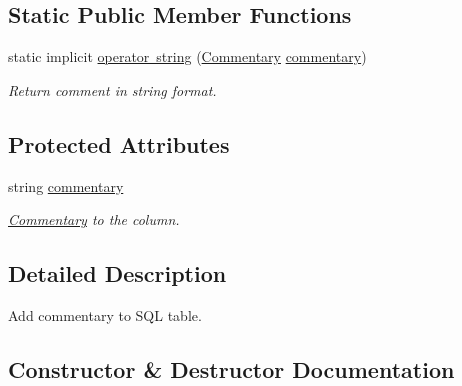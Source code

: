 \subsection*{Static Public Member Functions}
\begin{DoxyCompactItemize}
\item 
static implicit \mbox{\hyperlink{class_uniform_data_operator_1_1_sql_1_1_attributes_1_1_commentary_adb8a38bd8b9febe1222e715e7f7309d8}{operator string}} (\mbox{\hyperlink{class_uniform_data_operator_1_1_sql_1_1_attributes_1_1_commentary}{Commentary}} \mbox{\hyperlink{class_uniform_data_operator_1_1_sql_1_1_attributes_1_1_commentary_a5cb463ba92cc10199d1a8ffb8c8729fd}{commentary}})
\begin{DoxyCompactList}\small\item\em Return comment in string format. \end{DoxyCompactList}\end{DoxyCompactItemize}
\subsection*{Protected Attributes}
\begin{DoxyCompactItemize}
\item 
string \mbox{\hyperlink{class_uniform_data_operator_1_1_sql_1_1_attributes_1_1_commentary_a5cb463ba92cc10199d1a8ffb8c8729fd}{commentary}}
\begin{DoxyCompactList}\small\item\em \mbox{\hyperlink{class_uniform_data_operator_1_1_sql_1_1_attributes_1_1_commentary}{Commentary}} to the column. \end{DoxyCompactList}\end{DoxyCompactItemize}


\subsection{Detailed Description}
Add commentary to S\+QL table. 



\subsection{Constructor \& Destructor Documentation}
\mbox{\label{class_uniform_data_operator_1_1_sql_1_1_attributes_1_1_commentary_a32175c17c1db206f170ec84a8e83abd7}} 
